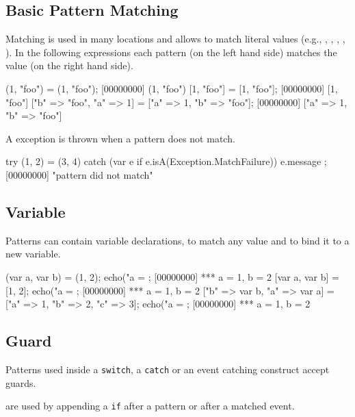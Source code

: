 \subsection{Basic Pattern Matching}

Matching is used in many locations and allows to match literal values (e.g.,
, , ,
, ).  In the following expressions each
pattern (on the left hand side) matches the value (on the right hand side).

\begin{urbiscript}
(1, "foo") = (1, "foo");
[00000000] (1, "foo")
[1, "foo"] = [1, "foo"];
[00000000] [1, "foo"]
["b" => "foo", "a" => 1] = ["a" => 1, "b" => "foo"];
[00000000] ["a" => 1, "b" => "foo"]
\end{urbiscript}

A  exception is thrown when a pattern does
not match.

\begin{urbiscript}
try
{
  (1, 2) = (3, 4)
}
catch (var e if e.isA(Exception.MatchFailure))
{
  e.message
};
[00000000] "pattern did not match"
\end{urbiscript}

\subsection{Variable}

Patterns can contain variable declarations, to match any value and to bind
it to a new variable.

\begin{urbiscript}
{
  (var a, var b) = (1, 2);
  echo("a = %
};
[00000000] *** a = 1, b = 2
{
  [var a, var b] = [1, 2];
  echo("a = %
};
[00000000] *** a = 1, b = 2
{
  ["b" => var b, "a" => var a] = ["a" => 1, "b" => 2, "c" => 3];
  echo("a = %
};
[00000000] *** a = 1, b = 2
\end{urbiscript}

\subsection{Guard}

Patterns used inside a \lstinline{switch}, a \lstinline{catch} or an event
catching construct accept guards.

 are used by appending a \lstinline{if} after a pattern or
after a matched event.

